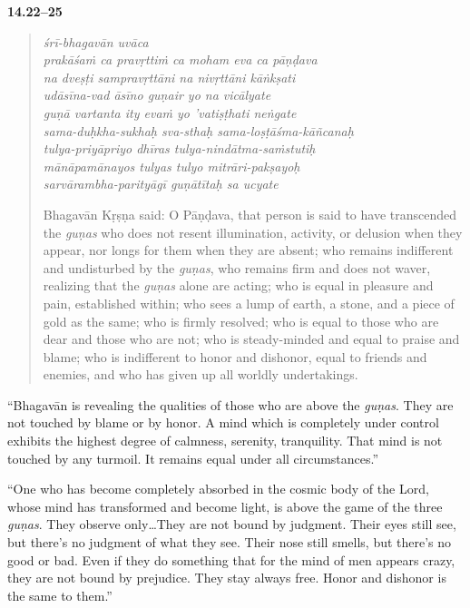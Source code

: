 \par\noindent\textbf{14.22–25}\par
\begin{verse}
\textit{śrī-bhagavān uvāca} \\
\textit{prakāśaṁ ca pravṛttiṁ ca moham eva ca pāṇḍava} \\
\textit{na dveṣṭi sampravṛttāni na nivṛttāni kāṅkṣati} \\
\textit{udāsīna-vad āsīno guṇair yo na vicālyate} \\
\textit{guṇā vartanta ity evaṁ yo ’vatiṣṭhati neṅgate} \\
\textit{sama-duḥkha-sukhaḥ sva-sthaḥ sama-loṣṭāśma-kāñcanaḥ} \\
\textit{tulya-priyāpriyo dhīras tulya-nindātma-saṁstutiḥ} \\
\textit{mānāpamānayos tulyas tulyo mitrāri-pakṣayoḥ} \\
\textit{sarvārambha-parityāgī guṇātītaḥ sa ucyate}

\noindent Bhagavān Kṛṣṇa said: O Pāṇḍava, that person is said to have transcended the \textit{guṇas} who does not resent illumination, activity, or delusion when they appear, nor longs for them when they are absent; who remains indifferent and undisturbed by the \textit{guṇas}, who remains firm and does not waver, realizing that the \textit{guṇas} alone are acting; who is equal in pleasure and pain, established within; who sees a lump of earth, a stone, and a piece of gold as the same; who is firmly resolved; who is equal to those who are dear and those who are not; who is steady-minded and equal to praise and blame; who is indifferent to honor and dishonor, equal to friends and enemies, and who has given up all worldly undertakings.
\end{verse}
\par



\enquote{Bhagavān is revealing the qualities of those who are above the \textit{guṇas}. They are not touched by blame or by honor. A mind which is completely under control exhibits the highest degree of calmness, serenity, tranquility. That mind is not touched by any turmoil. It remains equal under all circumstances.}

\enquote{One who has become completely absorbed in the cosmic body of the Lord, whose mind has transformed and become light, is above the game of the three \textit{guṇas}. They observe only\ldots They are not bound by judgment. Their eyes still see, but there’s no judgment of what they see. Their nose still smells, but there’s no good or bad. Even if they do something that for the mind of men appears crazy, they are not bound by prejudice. They stay always free. Honor and dishonor is the same to them.}


